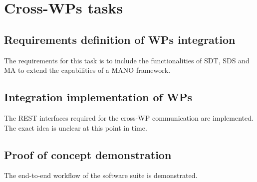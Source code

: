 \section{Cross-WPs tasks}
\subsection{Requirements definition of WPs integration}
The requirements for this task is to include the functionalities of SDT, SDS and MA to extend the capabilities of a MANO framework.

\subsection{Integration implementation of WPs}
The REST interfaces required for the cross-WP communication are implemented.
The exact idea is unclear at this point in time. 


\subsection{Proof of concept demonstration}
The end-to-end workflow of the software suite is demonstrated. 
